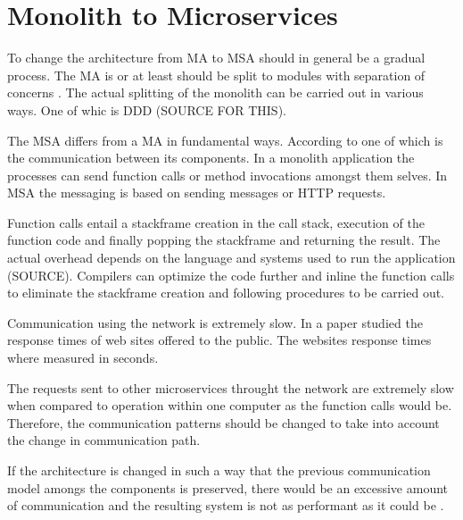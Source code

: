 \section{Monolith to Microservices}
\begin{sloppypar}
    To change the architecture from MA to MSA should in general be a gradual process. The 
    MA is or at least should be  split to modules with separation of concerns 
    \citep{secchalmsa}. The actual splitting of the monolith can be carried out
     in various ways. One of whic is DDD (SOURCE FOR THIS).
\end{sloppypar}
\begin{sloppypar}
    The MSA differs from a MA in fundamental ways. According to \citet{fowlerlewisms} 
    one of which is the communication between its components. In a monolith 
    application the processes can send function calls or method invocations 
    amongst them selves. In MSA the messaging is based on sending messages or 
    HTTP requests.
\end{sloppypar}
\begin{sloppypar}
    Function calls entail a stackframe creation in the call stack, execution of 
    the function code and finally popping the stackframe and returning the result. 
    The actual overhead depends on the language and systems used to run the 
    application (SOURCE). Compilers can optimize the code further and inline 
    the function calls to eliminate the stackframe creation and following 
    procedures to be carried out.
\end{sloppypar}
\begin{sloppypar}
    Communication using the network is extremely slow. In a paper \citet{webdelays} 
    studied the response times of web sites offered to the public. The websites 
    response times where measured in seconds.
\end{sloppypar}
\begin{sloppypar}
    The requests sent to other microservices throught the network are extremely 
    slow when compared to operation within one computer as the function calls 
    would be. Therefore, the communication patterns should be changed to take 
    into account the change in communication path.
\end{sloppypar}
\begin{sloppypar}
    If the architecture is changed in such a way that the previous communication 
    model amongs the components is preserved, there would be an excessive amount 
    of communication and the resulting system is not as performant as it could 
    be \citep{fowlerlewisms}.
\end{sloppypar}

